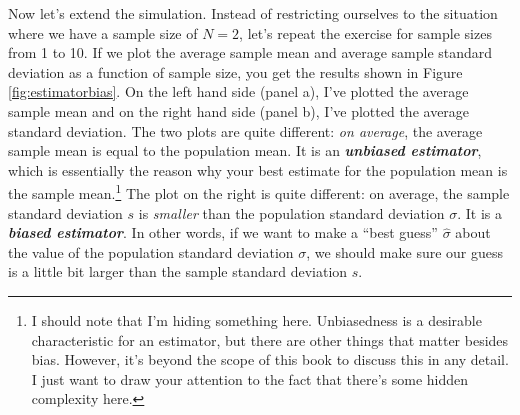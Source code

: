 \documentclass[spanish,]{book}
\let\rmarkdownfootnote\footnote%
\def\footnote{\protect\rmarkdownfootnote}
\begin{document}
Now let's extend the simulation. Instead of restricting ourselves to the
situation where we have a sample size of \(N=2\), let's repeat the
exercise for sample sizes from 1 to 10. If we plot the average sample
mean and average sample standard deviation as a function of sample size,
you get the results shown in Figure \ref{fig:estimatorbias}. On the left
hand side (panel a), I've plotted the average sample mean and on the
right hand side (panel b), I've plotted the average standard deviation.
The two plots are quite different: \emph{on average}, the average sample
mean is equal to the population mean. It is an \textbf{\emph{unbiased
estimator}}, which is essentially the reason why your best estimate for
the population mean is the sample mean.\footnote{I should note that I'm
  hiding something here. Unbiasedness is a desirable characteristic for
  an estimator, but there are other things that matter besides bias.
  However, it's beyond the scope of this book to discuss this in any
  detail. I just want to draw your attention to the fact that there's
  some hidden complexity here.} The plot on the right is quite
different: on average, the sample standard deviation \(s\) is
\emph{smaller} than the population standard deviation \(\sigma\). It is
a \textbf{\emph{biased estimator}}. In other words, if we want to make a
``best guess'' \(\hat\sigma\) about the value of the population standard
deviation \(\sigma\), we should make sure our guess is a little bit
larger than the sample standard deviation \(s\).
\end{document}
